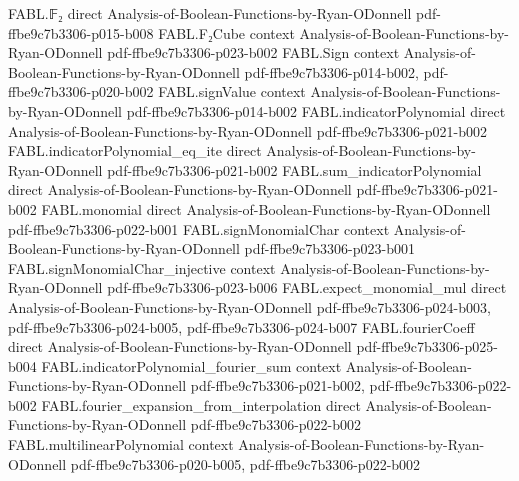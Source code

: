 \begin{theorem}
\leanok
{}
\proofstep
  {FABL.𝔽₂}
  {direct}
  {Analysis-of-Boolean-Functions-by-Ryan-ODonnell}
  {pdf-ffbe9c7b3306-p015-b008}
\proofstep
  {FABL.F₂Cube}
  {context}
  {Analysis-of-Boolean-Functions-by-Ryan-ODonnell}
  {pdf-ffbe9c7b3306-p023-b002}
\proofstep
  {FABL.Sign}
  {context}
  {Analysis-of-Boolean-Functions-by-Ryan-ODonnell}
  {pdf-ffbe9c7b3306-p014-b002,
    pdf-ffbe9c7b3306-p020-b002}
\proofstep
  {FABL.signValue}
  {context}
  {Analysis-of-Boolean-Functions-by-Ryan-ODonnell}
  {pdf-ffbe9c7b3306-p014-b002}
\proofstep
  {FABL.indicatorPolynomial}
  {direct}
  {Analysis-of-Boolean-Functions-by-Ryan-ODonnell}
  {pdf-ffbe9c7b3306-p021-b002}
\proofstep
  {FABL.indicatorPolynomial_eq_ite}
  {direct}
  {Analysis-of-Boolean-Functions-by-Ryan-ODonnell}
  {pdf-ffbe9c7b3306-p021-b002}
\proofstep
  {FABL.sum_indicatorPolynomial}
  {direct}
  {Analysis-of-Boolean-Functions-by-Ryan-ODonnell}
  {pdf-ffbe9c7b3306-p021-b002}
\proofstep
  {FABL.monomial}
  {direct}
  {Analysis-of-Boolean-Functions-by-Ryan-ODonnell}
  {pdf-ffbe9c7b3306-p022-b001}
\proofstep
  {FABL.signMonomialChar}
  {context}
  {Analysis-of-Boolean-Functions-by-Ryan-ODonnell}
  {pdf-ffbe9c7b3306-p023-b001}
\proofstep
  {FABL.signMonomialChar_injective}
  {context}
  {Analysis-of-Boolean-Functions-by-Ryan-ODonnell}
  {pdf-ffbe9c7b3306-p023-b006}
\proofstep
  {FABL.expect_monomial_mul}
  {direct}
  {Analysis-of-Boolean-Functions-by-Ryan-ODonnell}
  {pdf-ffbe9c7b3306-p024-b003,
    pdf-ffbe9c7b3306-p024-b005,
    pdf-ffbe9c7b3306-p024-b007}
\proofstep
  {FABL.fourierCoeff}
  {direct}
  {Analysis-of-Boolean-Functions-by-Ryan-ODonnell}
  {pdf-ffbe9c7b3306-p025-b004}
\proofstep
  {FABL.indicatorPolynomial_fourier_sum}
  {context}
  {Analysis-of-Boolean-Functions-by-Ryan-ODonnell}
  {pdf-ffbe9c7b3306-p021-b002,
    pdf-ffbe9c7b3306-p022-b002}
\proofstep
  {FABL.fourier_expansion_from_interpolation}
  {direct}
  {Analysis-of-Boolean-Functions-by-Ryan-ODonnell}
  {pdf-ffbe9c7b3306-p022-b002}
\proofstep
  {FABL.multilinearPolynomial}
  {context}
  {Analysis-of-Boolean-Functions-by-Ryan-ODonnell}
  {pdf-ffbe9c7b3306-p020-b005,
    pdf-ffbe9c7b3306-p022-b002}
\proofstep

\end{theorem}
